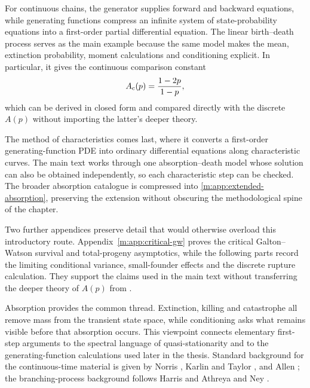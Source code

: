 For continuous chains, the generator supplies forward and backward equations,
while generating functions compress an infinite system of state-probability
equations into a first-order partial differential equation.  The linear
birth--death process serves as the main example because the same model makes the
mean, extinction probability, moment calculations and conditioning explicit.  In
particular, it gives the continuous comparison constant
\[
  A_{\mathrm{c}}(p)=\frac{1-2p}{1-p},
\]
which can be derived in closed form and compared directly with the discrete
$A(p)$ without importing the latter's deeper theory.

The method of characteristics comes last, where it converts a first-order
generating-function PDE into ordinary differential equations along characteristic
curves.  The main text works through one absorption--death model whose solution can
also be obtained independently, so each characteristic step can be checked.  The
broader absorption catalogue is compressed into
\cref{m:app:extended-absorption}, preserving the extension without obscuring the
methodological spine of the chapter.

Two further appendices preserve detail that would otherwise overload this
introductory route.  Appendix~\ref{m:app:critical-gw} proves the critical
Galton--Watson survival and total-progeny asymptotics, while the following parts
record the limiting conditional variance, small-founder effects and the discrete
rupture calculation.  They support the claims used in the main text without
transferring the deeper theory of $A(p)$ from \ChA.

Absorption provides the common thread.  Extinction, killing and catastrophe all
remove mass from the transient state space, while conditioning asks what remains
visible before that absorption occurs.  This viewpoint connects elementary
first-step arguments to the spectral language of quasi-stationarity and to the
generating-function calculations used later in the thesis.  Standard background
for the continuous-time material is given by Norris \cite{Norris1997}, Karlin and
Taylor \cite{KarlinTaylor1975}, and Allen \cite{Allen2010}; the branching-process
background follows Harris \cite{Harris1963} and Athreya and Ney
\cite{Athreya1972}.

